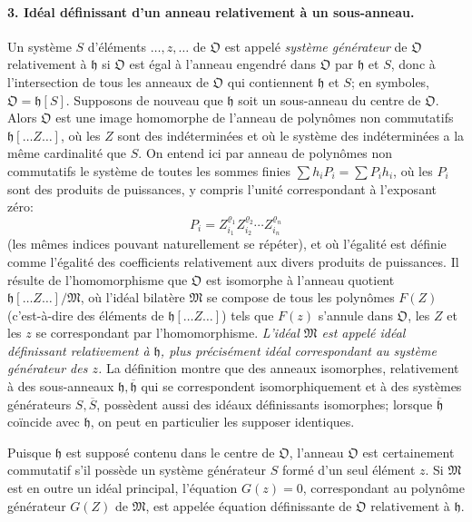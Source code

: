 \paragraph{3. Idéal définissant d'un anneau relativement à un sous-anneau.}
Un système \(S\) d'éléments \(\ldots,z,\ldots\) de \(\mathfrak O\) est appelé \emph{système générateur} de \(\mathfrak O\) relativement à \(\mathfrak h\) si \(\mathfrak O\) est égal à l'anneau engendré dans \(\mathfrak O\) par \(\mathfrak h\) et \(S\), donc à l'intersection de tous les anneaux de \(\mathfrak O\) qui contiennent \(\mathfrak h\) et \(S\); en symboles, \(\mathfrak O=\mathfrak h[S]\). Supposons de nouveau que \(\mathfrak h\) soit un sous-anneau du centre de \(\mathfrak O\). Alors \(\mathfrak O\) est une image homomorphe de l'anneau de polynômes non commutatifs \(\mathfrak h[\ldots Z\ldots]\), où les \(Z\) sont des indéterminées et où le système des indéterminées a la même cardinalité que \(S\). On entend ici par anneau de polynômes non commutatifs le système de toutes les sommes finies \(\sum h_iP_i=\sum P_ih_i\), où les \(P_i\) sont des produits de puissances, y compris l'unité correspondant à l'exposant zéro:
\[
P_i=Z_{i_1}^{\varrho_1}Z_{i_2}^{\varrho_2}\cdots Z_{i_n}^{\varrho_n}
\]
(les mêmes indices pouvant naturellement se répéter), et où l'égalité est définie comme l'égalité des coefficients relativement aux divers produits de puissances. Il résulte de l'homomorphisme que \(\mathfrak O\) est isomorphe à l'anneau quotient \(\mathfrak h[\ldots Z\ldots]/\mathfrak M\), où l'idéal bilatère \(\mathfrak M\) se compose de tous les polynômes \(F(Z)\) (c'est-à-dire des éléments de \(\mathfrak h[\ldots Z\ldots]\)) tels que \(F(z)\) s'annule dans \(\mathfrak O\), les \(Z\) et les \(z\) se correspondant par l'homomorphisme. \emph{L'idéal \(\mathfrak M\) est appelé idéal définissant relativement à \(\mathfrak h\), plus précisément idéal correspondant au système générateur des \(z\).} La définition montre que des anneaux isomorphes, relativement à des sous-anneaux \(\mathfrak h,\overline{\mathfrak h}\) qui se correspondent isomorphiquement et à des systèmes générateurs \(S,\overline S\), possèdent aussi des idéaux définissants isomorphes; lorsque \(\overline{\mathfrak h}\) coïncide avec \(\mathfrak h\), on peut en particulier les supposer identiques.

Puisque \(\mathfrak h\) est supposé contenu dans le centre de \(\mathfrak O\), l'anneau \(\mathfrak O\) est certainement commutatif s'il possède un système générateur \(S\) formé d'un seul élément \(z\). Si \(\mathfrak M\) est en outre un idéal principal, l'équation \(G(z)=0\), correspondant au polynôme générateur \(G(Z)\) de \(\mathfrak M\), est appelée équation définissante de \(\mathfrak O\) relativement à \(\mathfrak h\).


